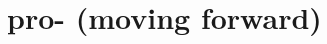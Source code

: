 \chapter{pro- (moving forward)}

\begin{vocabulary}[proceed]
\end{vocabulary}

\begin{vocabulary}[progress]
\end{vocabulary}